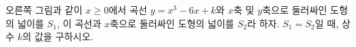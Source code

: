 \noindent\begin{minipage}[t]{0.58\linewidth}\vspace{0pt}\raggedright 오른쪽 그림과 같이 $x\ge 0$에서 곡선 $y=x^3-6x+k$와 $x$축 및 $y$축으로 둘러싸인 도형의 넓이를 $S_1$, 이 곡선과 $x$축으로 둘러싸인 도형의 넓이를 $S_2$라 하자. $S_1=S_2$일 때, 상수 $k$의 값을 구하시오. \end{minipage}\hfill\begin{minipage}[t]{0.4\linewidth}\vspace{0pt}\centering \resizebox{\ifdim\width>\linewidth\linewidth\else\width\fi}{!}{}\end{minipage}\par
